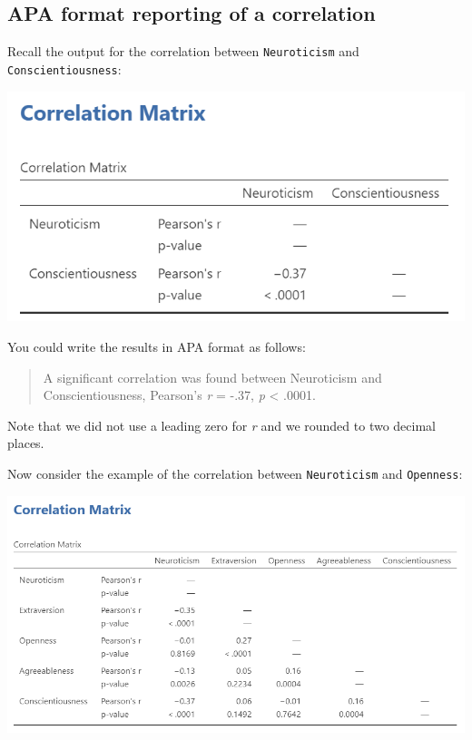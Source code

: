 \documentclass[
]{book}
\begin{document}
\hypertarget{apa-format-reporting-of-a-correlation-1}{%
\subsection{APA format reporting of a correlation}\label{apa-format-reporting-of-a-correlation-1}}

Recall the output for the correlation between \texttt{Neuroticism} and \texttt{Conscientiousness}:

\includegraphics{img/Correlation_Output.png}

You could write the results in APA format as follows:

\begin{quote}
A significant correlation was found between Neuroticism and Conscientiousness, Pearson's \emph{r} = -.37, \emph{p} \textless{} .0001.
\end{quote}

Note that we did not use a leading zero for \emph{r} and we rounded to two decimal places.

Now consider the example of the correlation between \texttt{Neuroticism} and \texttt{Openness}:

\includegraphics{img/Correlation2_Output.png}
\end{document}
